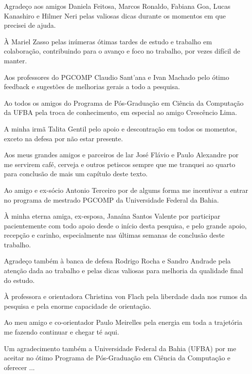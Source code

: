 Agradeço aos amigos
Daniela Feitosa, Marcos Ronaldo, Fabiana Goa, Lucas Kanashiro e Hilmer Neri
pelas valiosas dicas durante os momentos em que precisei de ajuda.

À Mariel Zasso pelas inúmeras ótimas tardes de estudo e trabalho em colaboração,
contribuindo para o avanço e foco no trabalho, por vezes difícil de manter.

Aos professores do PGCOMP Claudio Sant'ana e Ivan Machado pelo ótimo feedback e
sugestões de melhorias gerais a todo a pesquisa.

Ao todos os amigos do Programa de Pós-Graduação em Ciência da Computação da UFBA
pela troca de conhecimento, em especial ao amigo Crescêncio Lima.

A minha irmã Talita Gentil pelo apoio e descontração em todos os momentos,
exceto na defesa por não estar presente.

Aos meus grandes amigos e parceiros de lar José Flávio e Paulo Alexandre
por me servirem café, cerveja e outros petiscos sempre que me tranquei ao quarto
para conclusão de mais um capítulo deste texto.

Ao amigo e ex-sócio Antonio Terceiro por de algums forma me incentivar a
entrar no programa de mestrado PGCOMP da Universidade Federal da Bahia.

À minha eterna amiga, ex-esposa, Janaína Santos Valente por participar pacientemente
com todo apoio desde o início desta pesquisa, e pelo grande apoio, recepção e
carinho, especialmente nas últimas semanas de conclusão deste trabalho.

Agradeço também à banca de defesa Rodrigo Rocha e Sandro
Andrade pela atenção dada ao trabalho e pelas dicas valiosas para melhoria da
qualidade final do estudo.

À professora e orientadora Christina von Flach pela liberdade
dada nos rumos da pesquisa e pela enorme capacidade de orientação.

Ao meu amigo e co-orientador Paulo Meirelles pela energia em toda a trajetória
me fazendo continuar e chegar té aqui.

Um agradecimento também a Universidade Federal da Bahia (UFBA) por me aceitar no
ótimo Programa de Pós-Graduação em Ciência da Computação e oferecer ...
